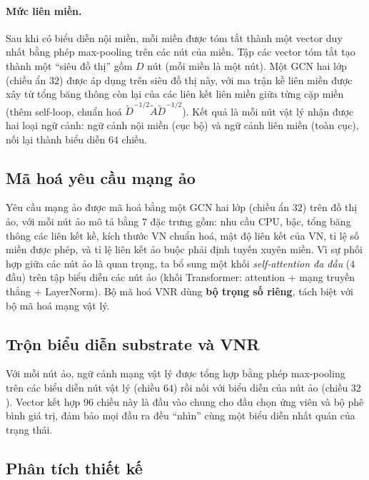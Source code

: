 \documentclass[../DoAn.tex]{subfiles}
\begin{document}
\paragraph{Mức liên miền.} Sau khi có biểu diễn nội miền, mỗi miền được tóm tắt thành một vector duy nhất bằng phép max-pooling trên các nút của miền. Tập các vector tóm tắt tạo thành một ``siêu đồ thị'' gồm $D$ nút (mỗi miền là một nút). Một GCN hai lớp (chiều ẩn $32$) được áp dụng trên siêu đồ thị này, với ma trận kề liên miền được xây từ tổng băng thông còn lại của các liên kết liên miền giữa từng cặp miền (thêm self-loop, chuẩn hoá $\tilde{D}^{-1/2}\tilde{A}\tilde{D}^{-1/2}$). Kết quả là mỗi nút vật lý nhận được hai loại ngữ cảnh: ngữ cảnh nội miền (cục bộ) và ngữ cảnh liên miền (toàn cục), nối lại thành biểu diễn $64$ chiều.

\subsection{Mã hoá yêu cầu mạng ảo}
\label{subsec:enc-vnr}

Yêu cầu mạng ảo được mã hoá bằng một GCN hai lớp (chiều ẩn $32$) trên đồ thị ảo, với mỗi nút ảo mô tả bằng $7$ đặc trưng gồm: nhu cầu CPU, bậc, tổng băng thông các liên kết kề, kích thước VN chuẩn hoá, mật độ liên kết của VN, tỉ lệ số miền được phép, và tỉ lệ liên kết ảo buộc phải định tuyến xuyên miền. Vì sự phối hợp giữa các nút ảo là quan trọng, ta bổ sung một khối \textit{self-attention đa đầu} ($4$ đầu) trên tập biểu diễn các nút ảo (khối Transformer: attention + mạng truyền thẳng + LayerNorm). Bộ mã hoá VNR dùng \textbf{bộ trọng số riêng}, tách biệt với bộ mã hoá mạng vật lý.

\subsection{Trộn biểu diễn substrate và VNR}
\label{subsec:enc-fusion}

Với mỗi nút ảo, ngữ cảnh mạng vật lý được tổng hợp bằng phép max-pooling trên các biểu diễn nút vật lý (chiều $64$) rồi nối với biểu diễn của nút ảo (chiều $32$). Vector kết hợp $96$ chiều này là đầu vào chung cho đầu chọn ứng viên và bộ phê bình giá trị, đảm bảo mọi đầu ra đều ``nhìn'' cùng một biểu diễn nhất quán của trạng thái.

\subsection{Phân tích thiết kế}
\label{subsec:enc-analysis}
\end{document}
